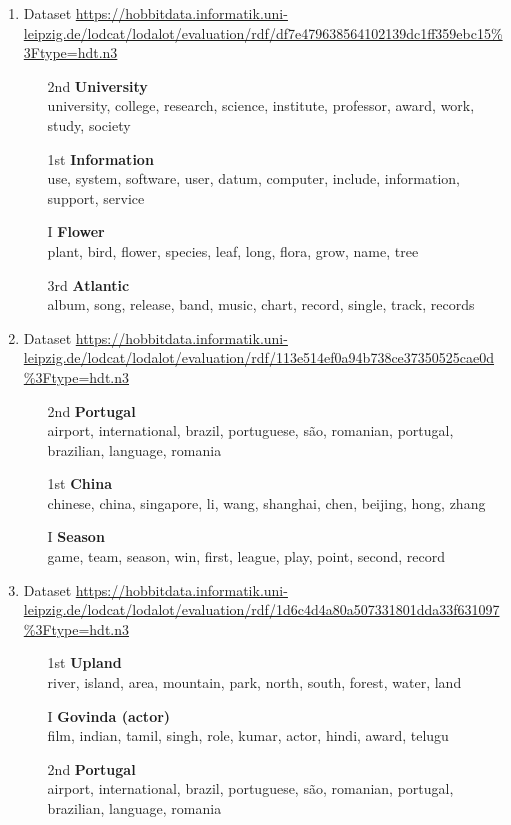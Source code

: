 \begin{enumerate}
\item Dataset \url{https://hobbitdata.informatik.uni-leipzig.de/lodcat/lodalot/evaluation/rdf/df7e479638564102139dc1ff359ebc15%3Ftype=hdt.n3}
\begin{itemize}
\item[2nd] \textbf{University}\\
university,
college, research, science, institute, professor, award, work, study, society
\item[1st] \textbf{Information}\\
use, system,
software, user, datum, computer, include, information, support, service
\item[I] \textbf{Flower}\\
plant, bird, flower, species,
leaf, long, flora, grow, name, tree
\item[3rd] \textbf{Atlantic}\\
album, song, release, band, music, chart, record, single, track,
records
\end{itemize}
\vspace{1cm}

\item Dataset \url{https://hobbitdata.informatik.uni-leipzig.de/lodcat/lodalot/evaluation/rdf/113e514ef0a94b738ce37350525cae0d%3Ftype=hdt.n3}
\begin{itemize}
\item[2nd] \textbf{Portugal}\\
airport,
international, brazil, portuguese, são, romanian, portugal, brazilian, language, romania
\item[1st] \textbf{China}\\
chinese,
china, singapore, li, wang, shanghai, chen, beijing, hong, zhang
\item[I] \textbf{Season}\\
game, team, season, win, first,
league, play, point, second, record
\end{itemize}
\vspace{1cm}

\item Dataset \url{https://hobbitdata.informatik.uni-leipzig.de/lodcat/lodalot/evaluation/rdf/1d6c4d4a80a507331801dda33f631097%3Ftype=hdt.n3}
\begin{itemize}
\item[1st] \textbf{Upland}\\
river, island,
area, mountain, park, north, south, forest, water, land
\item[I] \textbf{Govinda (actor)}\\
film, indian, tamil, singh, role,
kumar, actor, hindi, award, telugu
\item[2nd] \textbf{Portugal}\\
airport, international, brazil, portuguese, são, romanian,
portugal, brazilian, language, romania
\end{itemize}
\vspace{1cm}


\end{enumerate}
